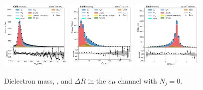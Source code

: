 \begin{figure}[htb!]
    \centering
    \includegraphics[width=0.3\textwidth]{chapters/Appendix/sectionPlots/figures/data_mc_overlays/emu_2016_cat_eq0_eq0_a_signal_linear_lepton_dilepton1_mass}
    \includegraphics[width=0.3\textwidth]{chapters/Appendix/sectionPlots/figures/data_mc_overlays/emu_2016_cat_eq0_eq0_a_signal_linear_lepton_dilepton1_pt}
    \includegraphics[width=0.3\textwidth]{chapters/Appendix/sectionPlots/figures/data_mc_overlays/emu_2016_cat_eq0_eq0_a_signal_linear_lepton_dilepton1_delta_r}
    \caption{Dielectron mass, \pt, and $\Delta R$ in the $e\mu$ channel
    with $N_{j} = 0$.}
    \label{fig:emu_1_dilepton}
\end{figure}

